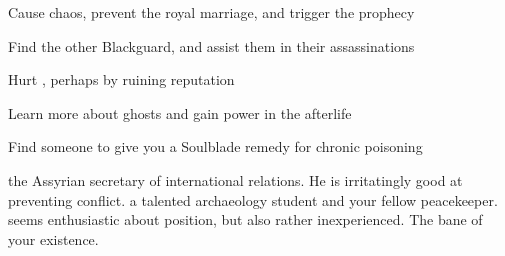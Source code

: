 \documentclass[char]{Kos}
\begin{document}
\begin{itemz}[Goals]
\item Cause chaos, prevent the royal marriage, and trigger the prophecy
\item Find the other Blackguard, and assist them in their assassinations
\item Hurt \cMerchant{}, perhaps by ruining \cMerchant{\their} reputation
\item Learn more about ghosts and gain power in the afterlife
\item Find someone to give you a Soulblade remedy for chronic poisoning
\end{itemz}

\begin{contacts}
 the Assyrian secretary of international relations. He is irritatingly good at preventing conflict.
\contact{\cArchaeologist{}} a talented archaeology student and your fellow peacekeeper. \cArchaeologist{\They} seems enthusiastic about \cArchaeologist{\their} position, but also rather inexperienced.
\contact{\cMerchant{}} The bane of your existence.
\end{contacts}
\end{document}
